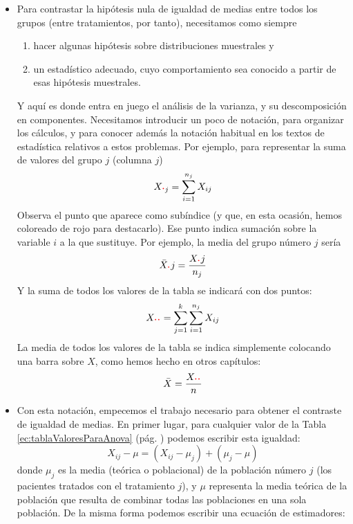 \begin{itemize}

    \item Para contrastar la hipótesis nula de igualdad de medias entre todos los grupos (entre tratamientos, por tanto), necesitamos como siempre
        \begin{enumerate}
        \item hacer algunas hipótesis sobre distribuciones muestrales y
        \item un estadístico adecuado, cuyo comportamiento sea conocido a partir de esas hipótesis muestrales.
        \end{enumerate}
        Y aquí es donde entra en juego el análisis de la varianza, y su descomposición en componentes. Necesitamos introducir un poco de notación, para organizar los cálculos, y para conocer además la notación habitual en los textos de estadística relativos a estos problemas. Por ejemplo, para representar la suma de valores del grupo $j$ (columna $j$)
        \[X_{\textcolor{red}{\mbox{\bf\large $\cdot$}}j}=\sum_{i=1}^{n_j}X_{ij}\]
        Observa el punto que aparece como subíndice (y que, en esta ocasión, hemos coloreado de rojo para destacarlo). Ese punto indica sumación sobre la variable $i$ a la que sustituye. Por ejemplo, la media del grupo número $j$ sería
        \[\bar X_{\textcolor{red}{\mbox{\bf\large $\cdot$}}}j=\dfrac{X_{\textcolor{red}{\mbox{\bf\large $\cdot$}}}j}{n_j}\]
        Y la suma de todos los valores de la tabla se indicará con dos puntos:
        \[X_{\textcolor{red}{\mbox{\bf\large $\cdot\cdot$}}}=\sum_{j=1}^k\sum_{i=1}^{n_j}X_{ij}\]
        La media de todos los valores de la tabla se indica simplemente colocando una barra sobre $X$, como hemos hecho en otros capítulos:
        \[\bar{X}=\dfrac{X_{\textcolor{red}{\mbox{\bf\large $\cdot\cdot$}}}}{n}\]


    \item Con esta notación, empecemos el trabajo necesario para obtener el contraste de igualdad de medias. En primer lugar, para cualquier valor de la Tabla \ref{ec:tablaValoresParaAnova} (pág. \pageref{ec:tablaValoresParaAnova}) podemos escribir esta igualdad:
        \[X_{ij}-\mu=(X_{ij}-\mu_j)+(\mu_j-\mu)\]
        donde $\mu_j$ es la media (teórica o poblacional) de la población número $j$ (los pacientes tratados con el tratamiento $j$), y $\mu$ representa la media teórica de la población que resulta de combinar todas las poblaciones en una sola población. De la misma forma podemos escribir una ecuación de estimadores:


\end{itemize}
